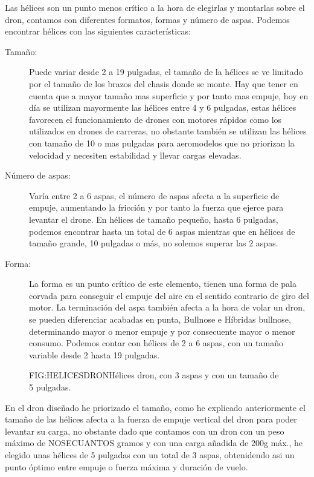 
 Las hélices son un punto menos crítico a la hora de elegirlas y montarlas sobre el dron, contamos con diferentes formatos, formas y número de aspas.
 Podemos encontrar hélices con las siguientes características:
 \begin{description}
        \item[Tamaño:] Puede variar desde 2 a 19 pulgadas, el tamaño de la hélices se ve limitado por el tamaño de los brazos del chasis donde se monte. Hay que tener en cuenta que a mayor tamaño mas superficie y por tanto mas empuje, hoy en día se utilizan mayormente las hélices entre 4 y 6 pulgadas, estas hélices favorecen el funcionamiento de drones con motores rápidos como los utilizados en drones de carreras, no obstante también se utilizan las hélices con tamaño de 10 o mas pulgadas para aeromodelos que no priorizan la velocidad y necesiten estabilidad y llevar cargas elevadas.
 		\item[Número de aspas:] Varía entre 2 a 6 aspas, el número de aspas afecta a la superficie de empuje, aumentando la fricción y por tanto la fuerza que ejerce para levantar el drone. En hélices de tamaño pequeño, hasta 6 pulgadas, podemos encontrar hasta un total de 6 aspas mientras que en hélices de tamaño grande, 10 pulgadas o más, no solemos superar las 2 aspas.
 		\item[Forma:] La forma es un punto crítico de este elemento, tienen una forma de pala corvada para conseguir el empuje del aire en el sentido contrario de giro del motor. La terminación del aspa también afecta a la hora de volar un dron, se pueden diferenciar acabadas en punta,  Bullnose e Híbridas bullnose, determinando mayor o menor empuje y por consecuente mayor o menor consumo.
 Podemos contar con hélices de 2 a 6 aspas, con un tamaño variable desde 2  hasta 19 pulgadas.
 
 \end{description}
 
\begin{figure}{FIG:HELICESDRON}{Hélices dron, con 3 aspas y con un tamaño de 5 pulgadas.}
\end{figure} 
 
 En el dron diseñado he priorizado el tamaño, como he explicado anteriormente el tamaño de las hélices afecta a la fuerza de empuje vertical del dron para poder levantar su carga, no obstante dado que contamos con un dron con un peso máximo de NOSECUANTOS gramos y con una carga añadida de 200g máx., he elegido unas hélices de 5 pulgadas con un total de 3 aspas, obtenidendo asi un punto óptimo entre empuje o fuerza máxima y duración de vuelo.
 

 